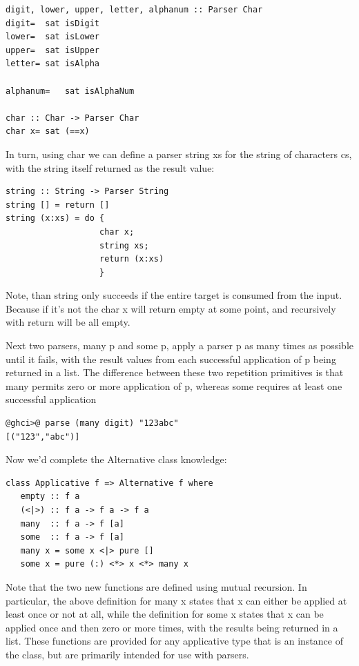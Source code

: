 \documentclass[a4papert]{article}
\begin{document}
\begin{lstlisting}[style=haskellstyle]
digit, lower, upper, letter, alphanum :: Parser Char
digit=  sat isDigit
lower=  sat isLower
upper=  sat isUpper
letter= sat isAlpha

alphanum=   sat isAlphaNum

char :: Char -> Parser Char
char x= sat (==x)

\end{lstlisting}
In turn, using char we can define a parser string xs for the string of characters cs, with the string itself returned as the result value:


\begin{lstlisting}[style=haskellstyle]
string :: String -> Parser String
string [] = return []
string (x:xs) = do {
                   char x;
                   string xs;
                   return (x:xs)
                   }
\end{lstlisting}


Note, than string only succeeds if the entire target is consumed from the input. Because if it's not the char x will return empty at some point, and recursively with return will be all empty.


Next two parsers, many p and some p, apply a parser p as many times as possible until it fails, with the result values from each successful application of p being returned in a list. The difference between these two repetition primitives is that many permits zero or more application of p, whereas some requires at least one successful application

\begin{lstlisting}[style=ghcistyle]
@ghci>@ parse (many digit) "123abc"
[("123","abc")]
\end{lstlisting}


Now we'd complete the Alternative class knowledge:


\begin{lstlisting}[style=haskellstyle]
class Applicative f => Alternative f where
   empty :: f a
   (<|>) :: f a -> f a -> f a
   many  :: f a -> f [a]
   some  :: f a -> f [a]
   many x = some x <|> pure []
   some x = pure (:) <*> x <*> many x
\end{lstlisting}


Note that the two new functions are defined using mutual recursion. In particular, the above definition for many x states that x can either be applied at least once or not at all, while the definition for some x states that x can be applied once and then zero or more times, with the results being returned in a list. These functions are provided for any applicative type that is an instance of the class, but are primarily intended for use with parsers.
\end{document}
